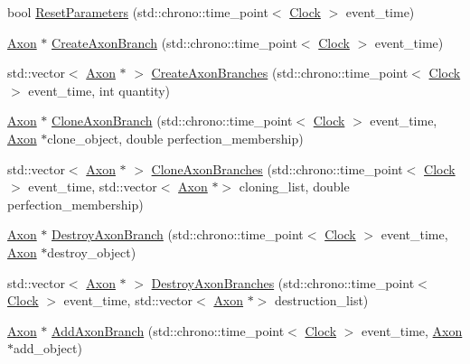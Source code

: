 \begin{DoxyCompactItemize}
\item 
bool \mbox{\hyperlink{class_axon_ae079e0b47f5027625da158930e4fa9c5}{Reset\+Parameters}} (std\+::chrono\+::time\+\_\+point$<$ \mbox{\hyperlink{universe_8h_a0ef8d951d1ca5ab3cfaf7ab4c7a6fd80}{Clock}} $>$ event\+\_\+time)
\item 
\mbox{\hyperlink{class_axon}{Axon}} $\ast$ \mbox{\hyperlink{class_axon_a41e97ead4c793003db2de87061574c26}{Create\+Axon\+Branch}} (std\+::chrono\+::time\+\_\+point$<$ \mbox{\hyperlink{universe_8h_a0ef8d951d1ca5ab3cfaf7ab4c7a6fd80}{Clock}} $>$ event\+\_\+time)
\item 
std\+::vector$<$ \mbox{\hyperlink{class_axon}{Axon}} $\ast$ $>$ \mbox{\hyperlink{class_axon_ab0da51c05a0879efdb45c594b68ef8fd}{Create\+Axon\+Branches}} (std\+::chrono\+::time\+\_\+point$<$ \mbox{\hyperlink{universe_8h_a0ef8d951d1ca5ab3cfaf7ab4c7a6fd80}{Clock}} $>$ event\+\_\+time, int quantity)
\item 
\mbox{\hyperlink{class_axon}{Axon}} $\ast$ \mbox{\hyperlink{class_axon_a7720ee66a75e87f4e308b82d1841443a}{Clone\+Axon\+Branch}} (std\+::chrono\+::time\+\_\+point$<$ \mbox{\hyperlink{universe_8h_a0ef8d951d1ca5ab3cfaf7ab4c7a6fd80}{Clock}} $>$ event\+\_\+time, \mbox{\hyperlink{class_axon}{Axon}} $\ast$clone\+\_\+object, double perfection\+\_\+membership)
\item 
std\+::vector$<$ \mbox{\hyperlink{class_axon}{Axon}} $\ast$ $>$ \mbox{\hyperlink{class_axon_af2d6d5bc9ee0cd8ff654a949ef1cc294}{Clone\+Axon\+Branches}} (std\+::chrono\+::time\+\_\+point$<$ \mbox{\hyperlink{universe_8h_a0ef8d951d1ca5ab3cfaf7ab4c7a6fd80}{Clock}} $>$ event\+\_\+time, std\+::vector$<$ \mbox{\hyperlink{class_axon}{Axon}} $\ast$$>$ cloning\+\_\+list, double perfection\+\_\+membership)
\item 
\mbox{\hyperlink{class_axon}{Axon}} $\ast$ \mbox{\hyperlink{class_axon_a6ac580e4565d24c955b0a48d7a8b20e2}{Destroy\+Axon\+Branch}} (std\+::chrono\+::time\+\_\+point$<$ \mbox{\hyperlink{universe_8h_a0ef8d951d1ca5ab3cfaf7ab4c7a6fd80}{Clock}} $>$ event\+\_\+time, \mbox{\hyperlink{class_axon}{Axon}} $\ast$destroy\+\_\+object)
\item 
std\+::vector$<$ \mbox{\hyperlink{class_axon}{Axon}} $\ast$ $>$ \mbox{\hyperlink{class_axon_aa9d26eed8d178527d1995adfad2f67ac}{Destroy\+Axon\+Branches}} (std\+::chrono\+::time\+\_\+point$<$ \mbox{\hyperlink{universe_8h_a0ef8d951d1ca5ab3cfaf7ab4c7a6fd80}{Clock}} $>$ event\+\_\+time, std\+::vector$<$ \mbox{\hyperlink{class_axon}{Axon}} $\ast$$>$ destruction\+\_\+list)
\item 
\mbox{\hyperlink{class_axon}{Axon}} $\ast$ \mbox{\hyperlink{class_axon_a6ed85466115dab46ef71f26a420249ff}{Add\+Axon\+Branch}} (std\+::chrono\+::time\+\_\+point$<$ \mbox{\hyperlink{universe_8h_a0ef8d951d1ca5ab3cfaf7ab4c7a6fd80}{Clock}} $>$ event\+\_\+time, \mbox{\hyperlink{class_axon}{Axon}} $\ast$add\+\_\+object)

\end{DoxyCompactItemize}
